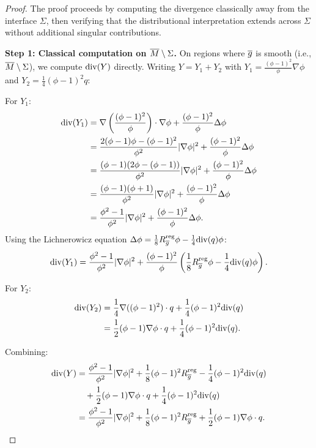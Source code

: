 \begin{proof}
The proof proceeds by computing the divergence classically away from the interface $\Sigma$, then verifying that the distributional interpretation extends across $\Sigma$ without additional singular contributions.

\textbf{Step 1: Classical computation on $\overline{M} \setminus \Sigma$.}
On regions where $\overline{g}$ is smooth (i.e., $\overline{M} \setminus \Sigma$), we compute $\mathrm{div}(Y)$ directly. Writing $Y = Y_1 + Y_2$ with $Y_1 = \frac{(\phi-1)^2}{\phi} \nabla \phi$ and $Y_2 = \frac{1}{4}(\phi-1)^2 q$:

For $Y_1$:
\begin{align}
    \mathrm{div}(Y_1) &= \nabla \left(\frac{(\phi-1)^2}{\phi}\right) \cdot \nabla \phi + \frac{(\phi-1)^2}{\phi} \Delta \phi \\
    &= \frac{2(\phi-1)\phi - (\phi-1)^2}{\phi^2} |\nabla \phi|^2 + \frac{(\phi-1)^2}{\phi} \Delta \phi \\
    &= \frac{(\phi-1)(2\phi - (\phi-1))}{\phi^2} |\nabla \phi|^2 + \frac{(\phi-1)^2}{\phi} \Delta \phi \\
    &= \frac{(\phi-1)(\phi+1)}{\phi^2} |\nabla \phi|^2 + \frac{(\phi-1)^2}{\phi} \Delta \phi \\
    &= \frac{\phi^2-1}{\phi^2} |\nabla \phi|^2 + \frac{(\phi-1)^2}{\phi} \Delta \phi.
\end{align}
Using the Lichnerowicz equation $\Delta \phi = \frac{1}{8}R^{\mathrm{reg}}_{\overline{g}} \phi - \frac{1}{4}\mathrm{div}(q) \phi$:
\begin{equation}
    \mathrm{div}(Y_1) = \frac{\phi^2-1}{\phi^2}|\nabla \phi|^2 + \frac{(\phi-1)^2}{\phi}\left(\frac{1}{8}R^{\mathrm{reg}}_{\overline{g}} \phi - \frac{1}{4}\mathrm{div}(q)\phi\right).
\end{equation}

For $Y_2$:
\begin{align}
    \mathrm{div}(Y_2) &= \frac{1}{4}\nabla((\phi-1)^2) \cdot q + \frac{1}{4}(\phi-1)^2 \mathrm{div}(q) \\
    &= \frac{1}{2}(\phi-1)\nabla\phi \cdot q + \frac{1}{4}(\phi-1)^2 \mathrm{div}(q).
\end{align}

Combining:
\begin{align}
    \mathrm{div}(Y) &= \frac{\phi^2-1}{\phi^2}|\nabla \phi|^2 + \frac{1}{8}(\phi-1)^2 R^{\mathrm{reg}}_{\overline{g}} - \frac{1}{4}(\phi-1)^2\mathrm{div}(q) \\
    &\quad + \frac{1}{2}(\phi-1)\nabla\phi \cdot q + \frac{1}{4}(\phi-1)^2 \mathrm{div}(q) \\
    &= \frac{\phi^2-1}{\phi^2}|\nabla \phi|^2 + \frac{1}{8}(\phi-1)^2 R^{\mathrm{reg}}_{\overline{g}} + \frac{1}{2}(\phi-1)\nabla\phi \cdot q.
\end{align}


\end{proof}
